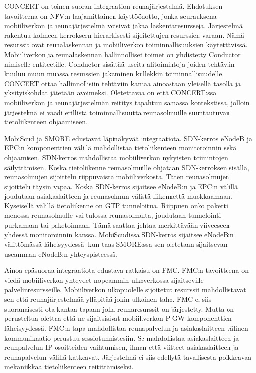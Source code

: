 CONCERT on toinen suoran integraation reunajärjestelmä. Ehdotuksen tavoitteena on NFV:n laajamittainen käyttöönotto, jonka seurauksena mobiiliverkon ja reunajärjestelmä voisivat jakaa laskentaresursseja. Järjestelmä rakentuu kolmeen kerrokseen hierarkisesti sijoitettujen resurssien varaan. Nämä resurssit ovat reunalaskennan ja mobiiliverkon toiminnallisuuksien käytettävissä. 
Mobiiliverkon ja reunalaskennan hallinnolliset toimet on yhdistetty Conductor nimiselle entiteetille. Conductor sisältää useita alitoimintoja joiden tehtäviin kuuluu muun muassa resurssien jakaminen kullekkin toiminnallisuudelle. CONCERT ottaa hallinnollisiin tehtäviin kantaa ainoastaan yleisellä tasolla ja yksityiskohdat jätetään avoimeksi. Oletettavaa on että CONCERT:ssa mobiiliverkon ja reunajärjestelmän reititys tapahtuu samassa kontekstissa, jolloin järjestelmä ei vaadi erillistä toiminnallisuutta reunasolmuille suuntautuvan tietoliikenteen ohjaamiseen. 

MobiScud ja SMORE edustavat läpinäkyvää integraatiota.
SDN-kerros eNodeB ja EPC:n komponenttien välillä mahdollistaa tietoliikenteen monitoroinnin sekä ohjaamisen.
SDN-kerros mahdollistaa mobiiliverkon nykyisten toimintojen säilyttämisen.
Koska tietoliikenne reunasolmuille ohjataan SDN-kerroksen sisällä, reunasolmujen sijoittelu riippuvaista mobiiliverkosta. 
Täten reunasolmujen sijoittelu täysin vapaa.
Koska SDN-kerros sijaitsee eNodeB:n ja EPC:n välillä joudutaan asiakaslaitteen ja reunasolmun välistä liikennettä muokkaamaan. Kyseisellä välillä tietoliikenne on GTP tunneloitua.
Riippuen onko paketti menossa reunasolmulle vai tulossa reunasolmulta, joudutaan tunnelointi purkamaan tai paketoimaan. Tämä saattaa johtaa merkittävään viiveeseen yhdessä monitoroinnin kanssa.
MobiScudissa SDN-kerros sijaitsee eNodeB:n välittömässä läheisyydessä, kun taas SMORE:ssa sen oletetaan sijaitsevan useamman eNodeB:n yhteyspisteessä. 

Ainoa epäsuoraa integraatiota edustava ratkaisu on FMC. FMC:n tavoitteena on viedä mobiiliverkon yhteydet nopeammin ulkoverkossa sijaitseville palvelinresursseille. Mobiiliverkon ulkopuolelle sijoitetut resurssit mahdollistavat sen että reunajärjestelmää ylläpitää jokin ulkoinen taho.
FMC ei siis suoranaisesti ota kantaa tapaan jolla reunaresurssit on järjestetty. Mutta on perusteltua olettaa että ne sijaitsisivat mobiiliverkon P-GW komponenttien läheisyydessä.
FMC:n tapa mahdollistaa reunapalvelun ja asiakaslaitteen välinen kommunikaatio perustuu sessiotunnistesiin. Se mahdollistaa asiakaslaitteen ja reunpalvelun IP-osoitteiden vaihtumisen, ilman että viitteet asiakaslaitteen ja reunapalvelun välillä katkeavat. Järjestelmä ei siis edellytä tavallisesta poikkeavaa mekaniikkaa tietoliikenteen reitittämiseksi.

